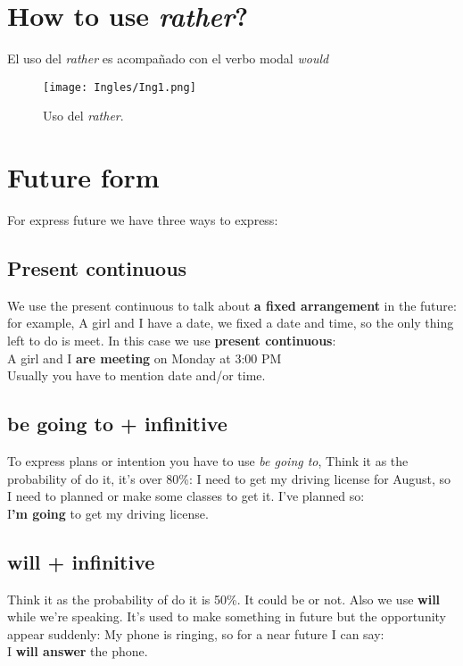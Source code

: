 \documentclass[
	12pt, %
	fleqn, %
	a4paper, %
]{LegrandOrangeBook}
\begin{document}
\section{How to use \textit{rather}?}
El uso del \textit{rather} es acompañado con el verbo modal \textit{would}
\begin{figure}[H]
\centering
\texttt{[image: Ingles/Ing1.png]}
\caption{Uso del \textit{rather}.}
\end{figure}
\section{Future form}
For express future we have three ways to express:
\subsection{Present continuous}
We use the present continuous to talk about \textbf{a fixed arrangement} in the future: for example, A girl and I have a date, we fixed a date and time, so the only thing left to do is meet. In this case we use \textbf{present continuous}:\\
A girl and I \textbf{are meeting} on Monday at 3:00 PM\\
Usually you have to mention date and/or time.
\subsection{be going to + infinitive}
To express plans or intention you have to use \textit{be going to}, Think it as the probability of do it, it's over 80\%: I need to get my driving license for August, so I need to planned or make some classes to get it. I've planned so:\\
I\textbf{'m going} to get my driving license.
\subsection{will + infinitive}
Think it as the probability of do it is 50\%. It could be or not. Also we use \textbf{will} while we're speaking. It's used to make something in future but the opportunity appear suddenly: My phone is ringing, so for a near future I can say:\\
I \textbf{will answer} the phone.
\end{document}

